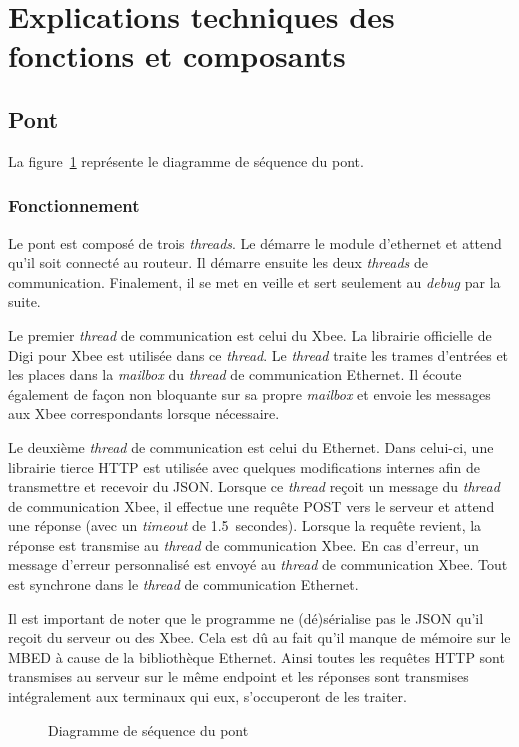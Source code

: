 \section{Explications techniques des fonctions et composants}
	\subsection{Pont}
	La figure~\ref{fig.pontseq} représente le diagramme de séquence du pont.
		\subsubsection{Fonctionnement}
		Le pont est composé de trois \emph{threads}. Le  démarre le module d’ethernet et attend qu’il soit connecté au routeur. Il démarre ensuite les deux \emph{threads} de communication. Finalement, il se met en veille et sert seulement au \emph{debug} par la suite. 

		Le premier \emph{thread} de communication est celui du Xbee. La librairie officielle de Digi pour Xbee est utilisée dans ce \emph{thread}. Le \emph{thread} traite les trames d’entrées et les places dans la \emph{mailbox} du \emph{thread} de communication Ethernet. Il écoute également de façon non bloquante sur sa propre \emph{mailbox} et envoie les messages aux Xbee correspondants lorsque nécessaire.

		Le deuxième \emph{thread} de communication est celui du Ethernet. Dans celui-ci, une librairie tierce HTTP est utilisée avec quelques modifications internes afin de transmettre et recevoir du JSON. Lorsque ce \emph{thread} reçoit un message du \emph{thread} de communication Xbee, il effectue une requête POST vers le serveur et attend une réponse (avec un \emph{timeout} de 1.5~secondes). Lorsque la requête revient, la réponse est transmise au \emph{thread} de communication Xbee. En cas d’erreur, un message d’erreur personnalisé est envoyé au \emph{thread} de communication Xbee. Tout est synchrone dans le \emph{thread} de communication Ethernet.

		Il est important de noter que le programme ne (dé)sérialise pas le JSON qu’il reçoit du serveur ou des Xbee. Cela est dû au fait qu’il manque de mémoire sur le MBED à cause de la bibliothèque Ethernet. Ainsi toutes les requêtes HTTP sont transmises au serveur sur le même \og endpoint \fg{} et les réponses sont transmises intégralement aux terminaux qui eux, s’occuperont de les traiter.
		
		\begin{figure}[p]
			\centering
			
			\caption{Diagramme de séquence du pont}
			\label{fig.pontseq}
		\end{figure}
	
